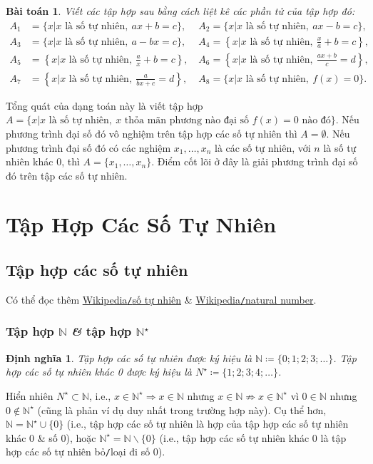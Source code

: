 \documentclass[oneside]{book}
\numberwithin{equation}{section}
\newtheorem{dinhnghia}{Định nghĩa}[section]
\newtheorem{baitoan}{Bài toán}[section]
\begin{document}
\begin{baitoan}
	Viết các tập hợp sau bằng cách liệt kê các phần tử của tập hợp đó:
	\begin{align*}
		A_1 &= \{x|x\mbox{ là số tự nhiên},\ ax + b = c\},\ && A_2 = \{x|x\mbox{ là số tự nhiên},\ ax - b = c\},\\
		A_3 &= \{x|x\mbox{ là số tự nhiên},\ a - bx = c\},\ && A_4 = \left\{x|x\mbox{ là số tự nhiên},\ \frac{x}{a} + b = c\right\},\\
		A_5 &= \left\{x|x\mbox{ là số tự nhiên},\ \frac{a}{x} + b = c\right\},\ && A_6 = \left\{x|x\mbox{ là số tự nhiên},\ \frac{ax + b}{c} = d\right\},\\
		A_7 &= \left\{x|x\mbox{ là số tự nhiên},\ \frac{a}{bx + c} = d\right\},\ && A_8 = \{x|x\mbox{ là số tự nhiên},\ f(x) = 0\}.
	\end{align*}
\end{baitoan}
Tổng quát của dạng toán này là viết tập hợp $A = \{x|x\mbox{ là số tự nhiên},\ x \mbox{ thỏa mãn phương nào đại số }f(x) = 0\mbox{ nào đó}\}$. Nếu phương trình đại số đó vô nghiệm trên tập hợp các số tự nhiên thì $A = \emptyset$. Nếu phương trình đại số đó có các nghiệm $x_1,\ldots,x_n$ là các số tự nhiên, với $n$ là số tự nhiên khác 0, thì $A = \{x_1,\ldots,x_n\}$. Điểm cốt lõi ở đây là giải phương trình đại số đó trên tập các số tự nhiên.


\section{Tập Hợp Các Số Tự Nhiên}

\subsection{Tập hợp các số tự nhiên}
Có thể đọc thêm \href{https://vi.wikipedia.org/wiki/S%E1%BB%91_t%E1%BB%B1_nhi%C3%AAn}{Wikipedia\texttt{/}số tự nhiên} \& \href{https://en.wikipedia.org/wiki/Natural_number}{Wikipedia\texttt{/}natural number}.

\subsubsection{Tập hợp $\mathbb{N}$ \textit{\&} tập hợp $\mathbb{N}^\star$}
\begin{dinhnghia}
	\emph{Tập hợp các số tự nhiên} được ký hiệu là $\mathbb{N}\coloneqq\{0;1;2;3;\ldots\}$. \emph{Tập hợp các số tự nhiên khác 0} được ký hiệu là $N^\star\coloneqq\{1;2;3;4;\ldots\}$.
\end{dinhnghia}
Hiển nhiên $N^\star\subset\mathbb{N}$, i.e., $x\in\mathbb{N}^\star\Rightarrow x\in\mathbb{N}$ nhưng $x\in\mathbb{N}\not\Rightarrow x\in\mathbb{N}^\star$ vì $0\in\mathbb{N}$ nhưng $0\notin\mathbb{N}^\star$ (cũng là phản ví dụ duy nhất trong trường hợp này). Cụ thể hơn, $\mathbb{N} = \mathbb{N}^\star\cup\{0\}$ (i.e., tập hợp các số tự nhiên là hợp của tập hợp các số tự nhiên khác 0 \& số 0), hoặc $\mathbb{N}^\star = \mathbb{N}\backslash\{0\}$ (i.e., tập hợp các số tự nhiên khác 0 là tập hợp các số tự nhiên bỏ\texttt{/}loại đi số 0).
\end{document}
